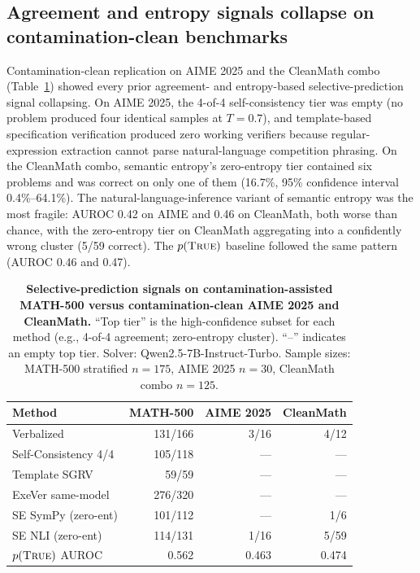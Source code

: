 \documentclass{article}
\begin{document}
\subsection{Agreement and entropy signals collapse on contamination-clean benchmarks}

Contamination-clean replication on AIME 2025 and the CleanMath combo (Table~\ref{tab:contam}) showed every prior agreement- and entropy-based selective-prediction signal collapsing. On AIME 2025, the 4-of-4 self-consistency tier was empty (no problem produced four identical samples at $T{=}0.7$), and template-based specification verification produced zero working verifiers because regular-expression extraction cannot parse natural-language competition phrasing. On the CleanMath combo, semantic entropy's zero-entropy tier contained six problems and was correct on only one of them (16.7\%, 95\% confidence interval 0.4\%--64.1\%). The natural-language-inference variant of semantic entropy was the most fragile: AUROC 0.42 on AIME and 0.46 on CleanMath, both worse than chance, with the zero-entropy tier on CleanMath aggregating into a confidently wrong cluster (5/59 correct). The $p(\textsc{True})$ baseline followed the same pattern (AUROC 0.46 and 0.47).

\begin{table}[t]
\centering
\caption{\textbf{Selective-prediction signals on contamination-assisted MATH-500 versus contamination-clean AIME 2025 and CleanMath.} ``Top tier'' is the high-confidence subset for each method (e.g., 4-of-4 agreement; zero-entropy cluster). ``--'' indicates an empty top tier. Solver: Qwen2.5-7B-Instruct-Turbo. Sample sizes: MATH-500 stratified $n{=}175$, AIME 2025 $n{=}30$, CleanMath combo $n{=}125$.}
\label{tab:contam}
\small
\setlength{\tabcolsep}{4pt}
\begin{tabular}{lrrr}
\toprule
Method & MATH-500 & AIME 2025 & CleanMath \\
\midrule
Verbalized            & 131/166 & 3/16    & 4/12  \\
Self-Consistency 4/4  & 105/118 & ---     & ---   \\
Template SGRV         & 59/59   & ---     & ---   \\
ExeVer same-model     & 276/320 & ---     & ---   \\
SE SymPy (zero-ent)   & 101/112 & ---     & 1/6   \\
SE NLI (zero-ent)     & 114/131 & 1/16    & 5/59  \\
$p(\textsc{True})$ AUROC & 0.562 & 0.463 & 0.474 \\
\bottomrule
\end{tabular}
\end{table}
\end{document}
